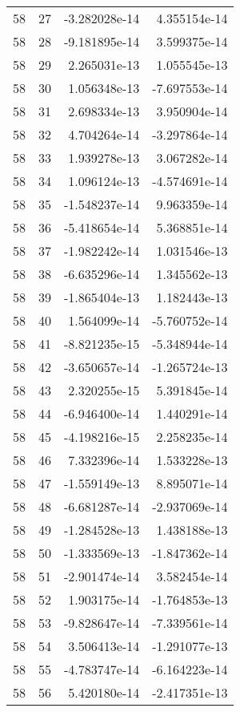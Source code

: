 \begin{tabular}{rrrr}
  58 &   27 & -3.282028e-14 &  4.355154e-14 \\
  58 &   28 & -9.181895e-14 &  3.599375e-14 \\
  58 &   29 &  2.265031e-13 &  1.055545e-13 \\
  58 &   30 &  1.056348e-13 & -7.697553e-14 \\
  58 &   31 &  2.698334e-13 &  3.950904e-14 \\
  58 &   32 &  4.704264e-14 & -3.297864e-14 \\
  58 &   33 &  1.939278e-13 &  3.067282e-14 \\
  58 &   34 &  1.096124e-13 & -4.574691e-14 \\
  58 &   35 & -1.548237e-14 &  9.963359e-14 \\
  58 &   36 & -5.418654e-14 &  5.368851e-14 \\
  58 &   37 & -1.982242e-14 &  1.031546e-13 \\
  58 &   38 & -6.635296e-14 &  1.345562e-13 \\
  58 &   39 & -1.865404e-13 &  1.182443e-13 \\
  58 &   40 &  1.564099e-14 & -5.760752e-14 \\
  58 &   41 & -8.821235e-15 & -5.348944e-14 \\
  58 &   42 & -3.650657e-14 & -1.265724e-13 \\
  58 &   43 &  2.320255e-15 &  5.391845e-14 \\
  58 &   44 & -6.946400e-14 &  1.440291e-14 \\
  58 &   45 & -4.198216e-15 &  2.258235e-14 \\
  58 &   46 &  7.332396e-14 &  1.533228e-13 \\
  58 &   47 & -1.559149e-13 &  8.895071e-14 \\
  58 &   48 & -6.681287e-14 & -2.937069e-14 \\
  58 &   49 & -1.284528e-13 &  1.438188e-13 \\
  58 &   50 & -1.333569e-13 & -1.847362e-14 \\
  58 &   51 & -2.901474e-14 &  3.582454e-14 \\
  58 &   52 &  1.903175e-14 & -1.764853e-13 \\
  58 &   53 & -9.828647e-14 & -7.339561e-14 \\
  58 &   54 &  3.506413e-14 & -1.291077e-13 \\
  58 &   55 & -4.783747e-14 & -6.164223e-14 \\
  58 &   56 &  5.420180e-14 & -2.417351e-13 \\

\end{tabular}

